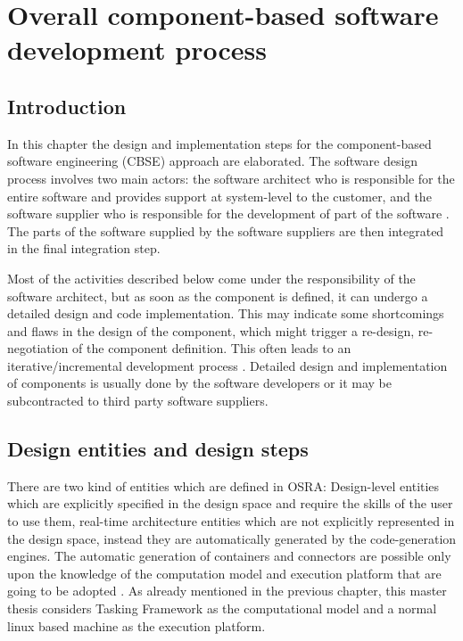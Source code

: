 
\chapter{Overall component-based software development process}
\label{chap: Software development process}
\section{Introduction}
In this chapter the design and implementation steps for the component-based software engineering (CBSE) approach are elaborated. The software design process involves two main actors: the software architect who is responsible for the entire software and provides support at system-level to the customer, and the software supplier who is responsible for the development of part of the software \cite{CompBasedProcess}. The parts of the software supplied by the software suppliers are then integrated in the final integration step.

Most of the activities described below come under the responsibility of the software architect, but as soon as the component is defined, it can undergo a detailed design and code implementation. This may indicate some shortcomings and flaws in the design of the component, which might trigger a re-design, re-negotiation of the component definition. This often leads to an iterative/incremental development process \cite{ScheduAnaly}. Detailed design and implementation of components is usually done by the software developers or it may be subcontracted to third party software suppliers. 

\section{Design entities and design steps}
There are two kind of entities which are defined in OSRA: Design-level entities which are explicitly specified in the design space and require the skills of the user to use them, real-time architecture entities which are not explicitly represented in the design space, instead they are automatically generated by the code-generation engines. The automatic generation of containers and connectors are possible only upon the knowledge of the computation model and execution platform that are going to be adopted \cite{SAVOIR,CompBasedProcess}. As already mentioned in the previous chapter, this master thesis considers Tasking Framework as the computational model and a normal linux based machine as the execution platform.   

